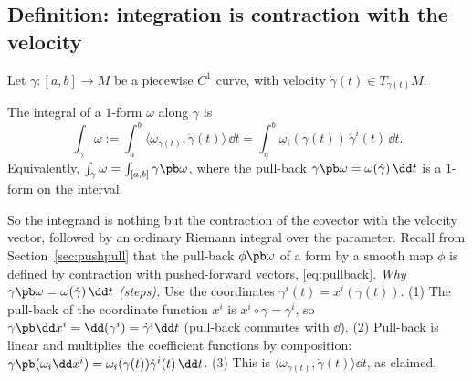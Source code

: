 \subsection{Definition: integration is contraction with the velocity}\label{sec:int1def}

Let $\gamma:[a,b]\to M$ be a piecewise $C^1$ curve, with velocity $\dot\gamma(t)\in T_{\gamma(t)}M$.

\begin{definition}
The integral of a $1$-form $\omega$ along $\gamma$ is
\begin{equation}\label{eq:lineint}
\int_\gamma\omega:=\int_a^b\bigl\langle\omega_{\gamma(t)},\dot\gamma(t)\bigr\rangle\,\dd t=\int_a^b\omega_i(\gamma(t))\,\dot\gamma^i(t)\,\dd t .
\end{equation}
Equivalently, $\int_\gamma\omega=\int_{[a,b]}\gamma\pb\omega$, where the pull-back $\gamma\pb\omega=\omega(\dot\gamma)\,\dd t$ is a $1$-form on the interval.
\end{definition}

So the integrand is nothing but the contraction of the covector with the velocity vector, followed by an ordinary Riemann integral over the parameter.
Recall from Section~\ref{sec:pushpull} that the pull-back $\phi\pb\omega$ of a form by a smooth map $\phi$ is defined by contraction with pushed-forward vectors, \eqref{eq:pullback}.
\emph{Why $\gamma\pb\omega=\omega(\dot\gamma)\,\dd t$ (steps).} Use the coordinates $\gamma^i(t)=x^i(\gamma(t))$. (1) The pull-back of the coordinate function $x^i$ is $x^i\circ\gamma=\gamma^i$, so $\gamma\pb\dd x^i=\dd(\gamma^i)=\dot\gamma^i\dd t$ (pull-back commutes with $\dd$).
(2) Pull-back is linear and multiplies the coefficient functions by composition: $\gamma\pb(\omega_i\dd x^i)=\omega_i(\gamma(t))\dot\gamma^i(t)\,\dd t$. (3) This is $\langle\omega_{\gamma(t)},\dot\gamma(t)\rangle\dd t$, as claimed.

